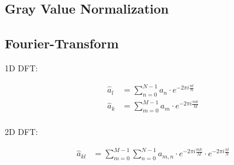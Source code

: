 \documentclass[a4paper,12pt]{article}
\begin{document}
	\subsection{Gray Value Normalization}
	\subsection{Fourier-Transform}
	
	1D DFT:
	
	\begin{align*}
		\hat{a}_l &= \sum\limits_{n = 0}^{N - 1} a_n \cdot e^{-2 \pi i \frac{nl}{N}} \\
		\hat{a}_k &= \sum\limits_{m = 0}^{M - 1} a_m \cdot e^{-2 \pi i \frac{mk}{M}} \\
	\end{align*}
	
	2D DFT:
	
	\begin{align*}
	\hat{a}_{kl} &= \sum\limits_{m = 0}^{M - 1} \sum\limits_{n = 0}^{N - 1} a_{m, n} \cdot e^{-2 \pi i \frac{mk}{M}} \cdot e^{-2 \pi i \frac{nl}{N}} \\
	\end{align*}
\end{document}
